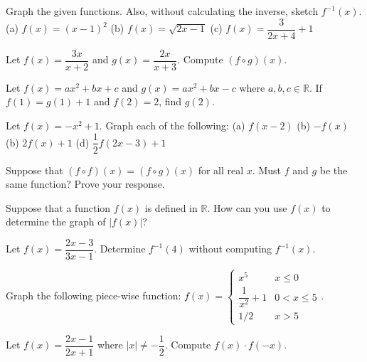 \documentclass[lang=en,11pt]{elegantbook}
\begin{document}
\begin{reviewset}
\item Graph the given functions.  Also, without calculating the inverse, sketch $f^{-1}(x)$.  \newline 
(a) $f(x)=(x-1)^2$ \hspace{18mm} (b) $f(x)=\sqrt{2x-1}$ \hspace{22mm} (c) $f(x)=\dfrac{3}{2x+4}+1$\vspace{2mm}

\item Let $f(x)=\dfrac{3x}{x+2}$ and $g(x)=\dfrac{2x}{x+3}$.  Compute $(f\circ g)(x)$.  \vspace{2mm}

\item Let $f(x)=ax^2+bx+c$ and $g(x)=ax^2+bx-c$ where $a,b,c\in\mathbb{R}$.  If $f(1)=g(1)+1$ and $f(2)=2$, find $g(2)$.\vspace{2mm}

\item Let $f(x)=-x^2+1$.  Graph each of the following: \newline 
(a) $f(x-2)$ \hspace{50mm} (b) $-f(x)$ \newline 
(b) $2f(x)+1$ \hspace{48mm} (d) $\dfrac{1}{2}f(2x-3)+1$\vspace{2mm}

\item Suppose that $(f\circ f)(x)=(f\circ g)(x)$ for all real $x$.  Must $f$ and $g$ be the same function?  Prove your response.  \vspace{2mm}

\item Suppose that a function $f(x)$ is defined in $\mathbb{R}$.  How can you use $f(x)$ to determine the graph of $|f(x)|$? \vspace{2mm}

\item Let $f(x)=\dfrac{2x-3}{3x-1}$.  Determine $f^{-1}(4)$ without computing $f^{-1}(x)$.\vspace{2mm}

\item Graph the following piece-wise function: $f(x)=\begin{cases} x^5 & x\leq 0 \\ \dfrac{1}{x^2}+1 & 0<x\leq 5 \\ 1/2 & x>5 \end{cases}$.\vspace{2mm}

\item Let $f(x)=\dfrac{2x-1}{2x+1}$ where $|x|\neq-\dfrac{1}{2}$.  Compute $f(x)\cdot f(-x)$.
\end{reviewset}
\end{document}

